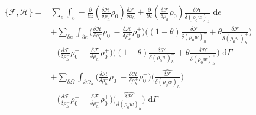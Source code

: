 \documentclass[a4paper,11pt]{article}
\begin{document}
 \begin{equation}
\begin{aligned}
 \{ \mathcal{F},  \mathcal{H}\} = &  \sum_e \int_e - \frac{\partial}{\partial z}(\frac{\delta  \mathcal{H}}{\delta \rho_h}\rho_0 ) \frac{\delta  \mathcal{F}}{\delta u_h} + \frac{\partial}{\partial z}(\frac{\delta  \mathcal{F}}{\delta \rho_h}\rho_0)\frac{\delta  \mathcal{H}}{\delta (\rho_0 w)_h} \text{ d}e \\
 &+ \sum_{\partial e} \int_{\partial e } \bigg(  \frac{\delta  \mathcal{H}}{\delta \rho_h^-}\rho_0^- -\frac{\delta  \mathcal{H}}{\delta \rho_h^+}\rho_0^+\bigg)\bigg ( (1-\theta) \frac{\delta  \mathcal{F}}{\delta  (\rho_0 w)_h^-}+ \theta\frac{\delta  \mathcal{F}}{\delta  (\rho_0 w)_h^+} \bigg)\\
 & - \bigg(  \frac{\delta  \mathcal{F}}{\delta \rho_h^-}\rho_0^- -\frac{\delta  \mathcal{F}}{\delta \rho_h^+}\rho_0^+\bigg)\bigg ( (1-\theta) \frac{\delta  \mathcal{H}}{\delta  (\rho_0 w)_h^-}+ \theta\frac{\delta  \mathcal{H}}{\delta  (\rho_0 w)_h^+} \bigg) \text{ d} \Gamma \\
 &+ \sum_{\partial \Omega} \int_{\partial \Omega_h } \bigg(  \frac{\delta  \mathcal{H}}{\delta \rho_h^-}\rho_0^- -\frac{\delta  \mathcal{H}}{\delta \rho_h^+}\rho_0^+\bigg)\bigg (   \widehat{\frac{\delta  \mathcal{F}}{\delta  (\rho_0 w)_h}} \bigg)\\
 & - \bigg(  \frac{\delta  \mathcal{F}}{\delta \rho_h^-}\rho_0^- -\frac{\delta  \mathcal{F}}{\delta \rho_h^+}\rho_0^+\bigg)\bigg (   \widehat{\frac{\delta  \mathcal{H}}{\delta  (\rho_0 w)_h}} \bigg) \text{ d}  \Gamma
 \end{aligned}
 \end{equation}
 
\end{document}
